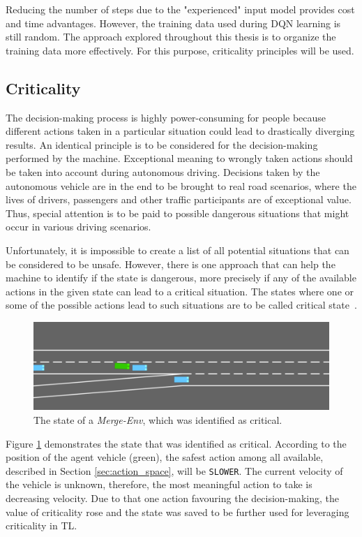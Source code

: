 Reducing the number of steps due to the "experienced" input model provides cost and time advantages. However, the training data used during DQN learning is still random. The approach explored throughout this thesis is to organize the training data more effectively. For this purpose, criticality principles will be used.

\subsection{Criticality}\label{sec:criticality}

The decision-making process is highly power-consuming for people because different actions taken in a particular situation could lead to drastically diverging results. An identical principle is to be considered for the decision-making performed by the machine. Exceptional meaning to wrongly taken actions should be taken into account during autonomous driving. Decisions taken by the autonomous vehicle are in the end to be brought to real road scenarios, where the lives of drivers, passengers and other traffic participants are of exceptional value. Thus, special attention is to be paid to possible dangerous situations that might occur in various driving scenarios. 

Unfortunately, it is impossible to create a list of all potential situations that can be considered to be unsafe. However, there is one approach that can help the machine to identify if the state is dangerous, more precisely if any of the available actions in the given state can lead to a critical situation. The states where one or some of the possible actions lead to such situations are to be called critical state~\cite{criticality2019}.

\begin{figure}[H]
    \centering
    \includegraphics[width=\textwidth]{images/Critical_state.png}
    \caption{The state of a \emph{Merge-Env}, which was identified as critical.}
    \label{fig:iterations_plot}
\end{figure}

Figure \ref{fig:iterations_plot} demonstrates the state that was identified as critical. According to the position of the agent vehicle (green), the safest action among all available, described in Section \ref{sec:action_space}, will be \texttt{SLOWER}. The current velocity of the vehicle is unknown, therefore, the most meaningful action to take is decreasing velocity. Due to that one action favouring the decision-making, the value of criticality rose and the state was saved to be further used for leveraging criticality in TL.

